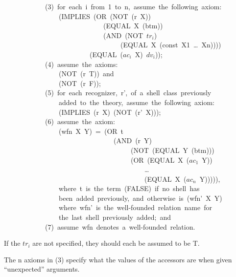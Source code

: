 \documentclass[11pt]{book}
\newenvironment{pubasis}{\begin{flushleft}\ttfamily\small}{\normalsize\rmfamily\end{flushleft}}
\begin{document}
\begin{pubasis}
~~~~~~~~~~~~(3)~for~each~i~from~1~to~n,~assume~the~following~axiom:\\

~~~~~~~~~~~~~~~~(IMPLIES~(OR~(NOT~(r~X))\\
~~~~~~~~~~~~~~~~~~~~~~~~~~~~~(EQUAL~X~(btm))\\
~~~~~~~~~~~~~~~~~~~~~~~~~~~~~(AND~(NOT~$tr_{i}$)\\
~~~~~~~~~~~~~~~~~~~~~~~~~~~~~~~~~~(EQUAL~X~(const~X1~\ldots{}~Xn))))\\
~~~~~~~~~~~~~~~~~~~~~~~~~(EQUAL~($ac_{i}$~X)~$dv_{i}$));\\

~~~~~~~~~~~~(4)~assume~the~axioms:\\

~~~~~~~~~~~~~~~~(NOT~(r~T))~and\\

~~~~~~~~~~~~~~~~(NOT~(r~F));\\

~~~~~~~~~~~~(5)~for~each~recognizer,~r',~of~a~shell~class~previously\\
~~~~~~~~~~~~~~~~added~to~the~theory,~assume~the~following~axiom:\\

~~~~~~~~~~~~~~~~(IMPLIES~(r~X)~(NOT~(r'~X)));\\

~~~~~~~~~~~~(6)~assume~the~axiom:\\
~~~~~~~~~~~~~~~~(wfn~X~Y)~=~(OR~t\\
~~~~~~~~~~~~~~~~~~~~~~~~~~~~~~~~(AND~(r~Y)\\
~~~~~~~~~~~~~~~~~~~~~~~~~~~~~~~~~~~~~(NOT~(EQUAL~Y~(btm)))\\
~~~~~~~~~~~~~~~~~~~~~~~~~~~~~~~~~~~~~(OR~(EQUAL~X~($ac_{1}$~Y))\\
~~~~~~~~~~~~~~~~~~~~~~~~~~~~~~~~~~~~~~~~~\ldots{}\\
~~~~~~~~~~~~~~~~~~~~~~~~~~~~~~~~~~~~~~~~~(EQUAL~X~($ac_{n}$~Y))))),\\

~~~~~~~~~~~~~~~~where~t~is~the~term~(FALSE)~if~no~shell~has\\
~~~~~~~~~~~~~~~~been~added~previously,~and~otherwise~is~(wfn'~X~Y)\\
~~~~~~~~~~~~~~~~where~wfn'~is~the~well-founded~relation~name~for\\
~~~~~~~~~~~~~~~~the~last~shell~previously~added;~and\\

~~~~~~~~~~~~(7)~assume~wfn~denotes~a~well-founded~relation.\\
\end{pubasis}
If the $tr_{i}$ are not
specified, they should each be assumed to be T.
\nopagebreak\par\hrulefill\nopagebreak\par
The n axioms in (3) specify what the values of the accessors
are when given ``unexpected'' arguments.
\end{document}
